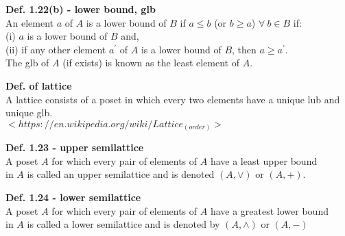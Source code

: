 \documentclass{article}
\begin{document}
\textbf{Def. 1.22(b) - lower bound, glb}\\
An element $a$ of $A$ is a lower bound of $B$ if $a \le b$ (or $ b\ge a$) $\forall \ b \in B$ if:\\
(i) $a$ is a lower bound of $B$ and,\\
(ii) if any other element $a^{'}$ of $A$ is a lower bound of $B$, then $a \ge a^{'}$.\\
The glb of $A$ (if exists) is known as the least element of $A$.
\newline

\textbf{Def. of lattice}\\
A lattice consists of a poset in which every two elements have a unique lub and unique glb.\\
$<https://en.wikipedia.org/wiki/Lattice_(order)>$
\newline

\textbf{Def. 1.23 - upper semilattice}\\
A poset $A$ for which every pair of elements of $A$ have a least upper bound\\
in $A$ is called an upper semilattice and is denoted $(A, \lor)$ or $(A, +)$.
\newline

\textbf{Def. 1.24 - lower semilattice}\\
A poset $A$ for which every pair of elements of $A$ have a greatest lower bound\\ 
in $A$ is called a lower semilattice and is denoted by $(A, \land)$ or $(A, -)$
\end{document}
